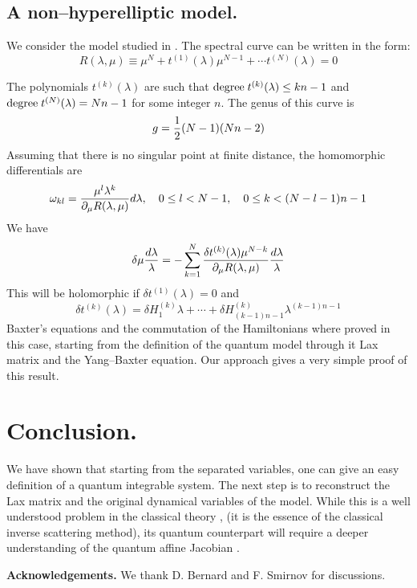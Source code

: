 \documentclass[a4paper,11pt]{article}
\begin{document}
\subsection{A non--hyperelliptic model.}
We consider the model studied in \cite{Skly92, Smi01,SmiZe02} . 
The spectral curve can be written in the form:
\begin{equation}
R(\lambda,\mu) \equiv \mu^N + t^{(1)}(\lambda) \mu^{N-1} + \cdots t^{(N)}(\lambda) = 0
\label{FedVacurve}
\end{equation}

The polynomials $t^{(k)}(\lambda)$ are such that 
${\rm degree}\; t^{(k)}(\lambda) \leq kn -1$ and 
$ {\rm degree}\; t^{(N)}(\lambda) = Nn -1$ 
for some integer $n$. The genus of this curve is
$$
g = {1\over 2} (N-1)(Nn-2)
$$
Assuming that there is no singular point at finite distance, the homomorphic differentials are
$$
\omega_{kl} = { \mu^l \lambda^k \over \partial_\mu R(\lambda,\mu) } d\lambda,\quad
0 \leq l < N-1,\quad 0 \leq k < (N-l-1)n -1
$$
We have
$$
\delta \mu {d\lambda \over \lambda} = - \sum_{k=1}^N {\delta t^{(k)}(\lambda) \mu^{N-k} 
\over \partial_\mu R(\lambda, \mu) } {d\lambda \over \lambda}
$$
This will be holomorphic if $\delta t^{(1)}(\lambda) = 0$ and
$$
\delta t^{(k)}(\lambda) =\delta H^{(k)}_1 \lambda  + \cdots  + \delta H^{(k)}_{(k-1)n -1}\lambda^{(k-1)n -1}
$$
Baxter's equations and the commutation of the Hamiltonians
where proved in this case, starting from the definition of the quantum model
through it Lax matrix and the Yang--Baxter equation. Our approach gives a very simple 
proof of this result.


\section{Conclusion.}

We have shown that starting from the separated 
variables, one can give an easy definition of a quantum integrable system.
The next step is to reconstruct the Lax matrix and the original dynamical
variables of the model. While this is a well understood problem in the classical theory 
\cite{DuKrNo90, BaBeTa03},
(it is the essence of the classical inverse scattering method), its quantum 
counterpart will require a deeper understanding of the quantum affine Jacobian \cite{Smi00}.

{\bf Acknowledgements.} We thank D. Bernard and F. Smirnov for discussions.
\end{document}
